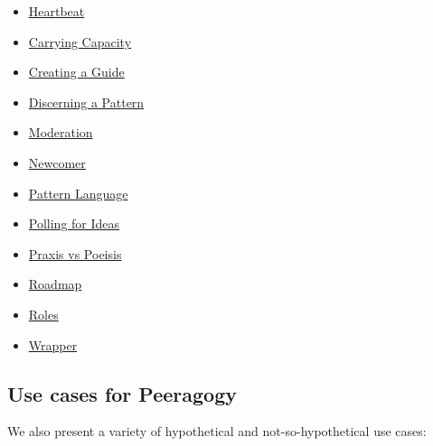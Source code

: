 \begin{itemize}
\item
  \href{http://peeragogy.org/patterns/heartbeat/}{Heartbeat}
\item
  \href{http://peeragogy.org/patterns/carrying-capacity/}{Carrying
  Capacity}
\item
  \href{http://peeragogy.org/patterns/creating-a-guide/}{Creating a
  Guide}
\item
  \href{http://peeragogy.org/patterns/discerning-a-pattern/}{Discerning
  a Pattern}
\item
  \href{http://peeragogy.org/patterns/moderation/}{Moderation}
\item
  \href{http://peeragogy.org/patterns/newcomer/}{Newcomer}
\item
  \href{http://peeragogy.org/patterns/pattern-language/}{Pattern
  Language}
\item
  \href{http://peeragogy.org/patterns/polling-for-ideas/}{Polling for
  Ideas}
\item
  \href{http://peeragogy.org/patterns/praxis-vs-poeisis/}{Praxis vs
  Poeisis}
\item
  \href{http://peeragogy.org/patterns/roadmap/}{Roadmap}
\item
  \href{http://peeragogy.org/patterns/roles/}{Roles}
\item
  \href{http://peeragogy.org/patterns/wrapper/}{Wrapper}
\end{itemize}

\subsection{Use cases for Peeragogy}

We also present a variety of hypothetical and not-so-hypothetical use
cases:

